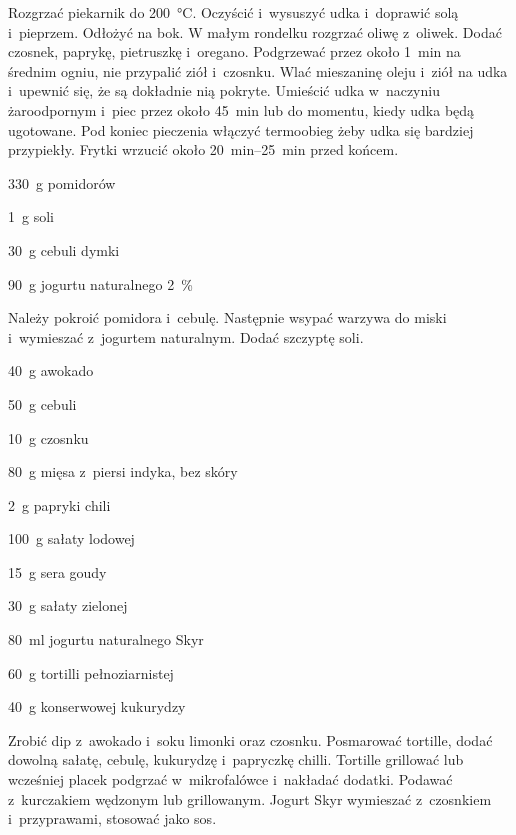 \documentclass[../main.tex]{subfiles}
\begin{document}
Rozgrzać piekarnik do \qty{200}{\celsius}. Oczyścić i~wysuszyć udka i~doprawić
solą i~pieprzem. Odłożyć na bok. W małym rondelku rozgrzać oliwę z~oliwek.
Dodać czosnek, paprykę, pietruszkę i~oregano. Podgrzewać przez około
\qty{1}{\minute} na średnim ogniu, nie przypalić ziół i~czosnku. Wlać
mieszaninę oleju i~ziół na udka i~upewnić się, że są dokładnie nią pokryte.
Umieścić udka w~naczyniu żaroodpornym i~piec przez około \qty{45}{\minute} lub
do momentu, kiedy udka będą ugotowane. Pod koniec pieczenia włączyć termoobieg
żeby udka się bardziej przypiekły. Frytki wrzucić około
\qtyrange{20}{25}{\minute} przed końcem.


\begin{Ingred}
    \item \qty{330}{\gram} pomidorów
    \item \qty{1}{\gram} soli
    \item \qty{30}{\gram} cebuli dymki
    \item \qty{90}{\gram} jogurtu naturalnego \qty{2}{\percent}
\end{Ingred}

Należy pokroić pomidora i~cebulę. Następnie wsypać warzywa do miski i~wymieszać
z~jogurtem naturalnym. Dodać szczyptę soli.


\begin{Ingred}
    \item \qty{40}{\gram} awokado
    \item \qty{50}{\gram} cebuli
    \item \qty{10}{\gram} czosnku
    \item \qty{80}{\gram} mięsa z~piersi indyka, bez skóry
    \item \qty{2}{\gram} papryki chili
    \item \qty{100}{\gram} sałaty lodowej
    \item \qty{15}{\gram} sera goudy
    \item \qty{30}{\gram} sałaty zielonej
    \item \qty{80}{\milli\litre} jogurtu naturalnego Skyr
    \item \qty{60}{\gram} tortilli pełnoziarnistej
    \item \qty{40}{\gram} konserwowej kukurydzy
\end{Ingred}

Zrobić dip z~awokado i~soku limonki oraz czosnku. Posmarować tortille, dodać
dowolną sałatę, cebulę, kukurydzę i~papryczkę chilli. Tortille grillować lub
wcześniej placek podgrzać w~mikrofalówce i~nakładać dodatki. Podawać
z~kurczakiem wędzonym lub grillowanym. Jogurt Skyr wymieszać z~czosnkiem
i~przyprawami, stosować jako sos.
\end{document}
